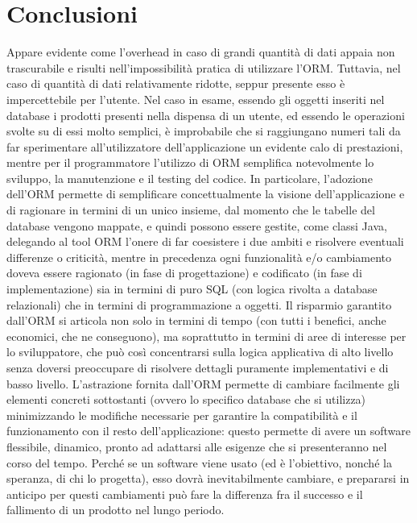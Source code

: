 \chapter{Conclusioni}

Appare evidente come l'overhead in caso di grandi quantità di dati appaia non trascurabile e risulti nell'impossibilità pratica di utilizzare l'ORM. Tuttavia, nel caso di quantità di dati relativamente ridotte, seppur presente esso è impercettebile per l'utente. Nel caso in esame, essendo gli oggetti inseriti nel database i prodotti presenti nella dispensa di un utente, ed essendo le operazioni svolte su di essi molto semplici, è improbabile che si raggiungano numeri tali da far sperimentare all'utilizzatore dell'applicazione un evidente calo di prestazioni, mentre per il programmatore l'utilizzo di ORM semplifica notevolmente lo sviluppo, la manutenzione e il testing del codice. In particolare, l'adozione dell'ORM permette di semplificare concettualmente la visione dell'applicazione e di ragionare in termini di un unico insieme, dal momento che le tabelle del database vengono mappate, e quindi possono essere gestite, come classi Java, delegando al tool ORM l'onere di far coesistere i due ambiti e risolvere eventuali differenze o criticità, mentre in precedenza ogni funzionalità e/o cambiamento doveva essere ragionato (in fase di progettazione) e codificato (in fase di implementazione) sia in termini di puro SQL (con logica rivolta a database relazionali) che in termini di programmazione a oggetti. Il risparmio garantito dall'ORM si articola non solo in termini di tempo (con tutti i benefici, anche economici, che ne conseguono), ma soprattutto in termini di aree di interesse per lo sviluppatore, che può così concentrarsi sulla logica applicativa di alto livello senza doversi preoccupare di risolvere dettagli puramente implementativi e di basso livello. L'astrazione fornita dall'ORM permette di cambiare facilmente gli elementi concreti sottostanti (ovvero lo specifico database che si utilizza) minimizzando le modifiche necessarie per garantire la compatibilità e il funzionamento con il resto dell'applicazione: questo permette di avere un software flessibile, dinamico, pronto ad adattarsi alle esigenze che si presenteranno nel corso del tempo. Perché se un software viene usato (ed è l'obiettivo, nonché la speranza, di chi lo progetta), esso dovrà inevitabilmente cambiare, e prepararsi in anticipo per questi cambiamenti può fare la differenza fra il successo e il fallimento di un prodotto nel lungo periodo. 
